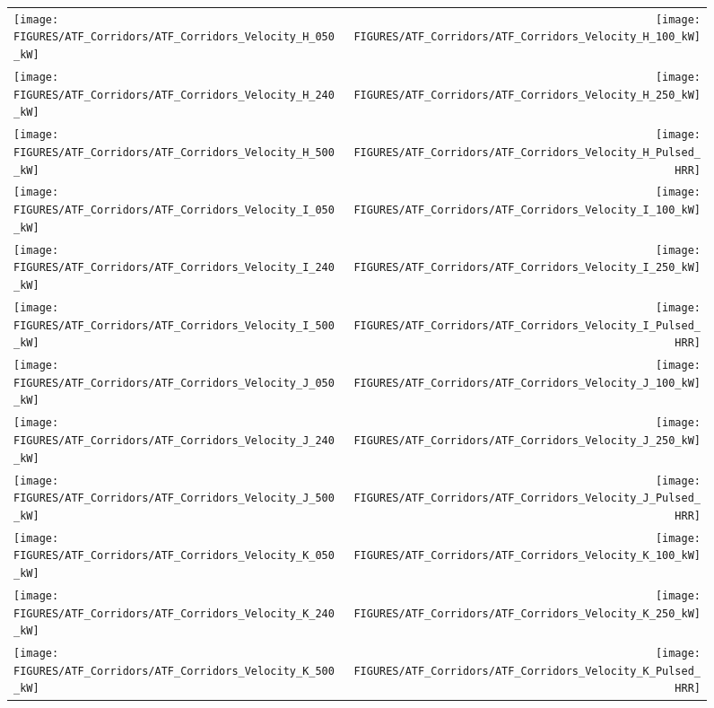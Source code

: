 \begin{figure}[h!]
\begin{tabular*}{\textwidth}{l@{\extracolsep{\fill}}r}
\texttt{[image: FIGURES/ATF\_Corridors/ATF\_Corridors\_Velocity\_H\_050\_kW]} &
\texttt{[image: FIGURES/ATF\_Corridors/ATF\_Corridors\_Velocity\_H\_100\_kW]} \\
\texttt{[image: FIGURES/ATF\_Corridors/ATF\_Corridors\_Velocity\_H\_240\_kW]} &
\texttt{[image: FIGURES/ATF\_Corridors/ATF\_Corridors\_Velocity\_H\_250\_kW]} \\
\texttt{[image: FIGURES/ATF\_Corridors/ATF\_Corridors\_Velocity\_H\_500\_kW]} &
\texttt{[image: FIGURES/ATF\_Corridors/ATF\_Corridors\_Velocity\_H\_Pulsed\_HRR]} \\
\texttt{[image: FIGURES/ATF\_Corridors/ATF\_Corridors\_Velocity\_I\_050\_kW]} &
\texttt{[image: FIGURES/ATF\_Corridors/ATF\_Corridors\_Velocity\_I\_100\_kW]} \\
\texttt{[image: FIGURES/ATF\_Corridors/ATF\_Corridors\_Velocity\_I\_240\_kW]} &
\texttt{[image: FIGURES/ATF\_Corridors/ATF\_Corridors\_Velocity\_I\_250\_kW]} \\
\texttt{[image: FIGURES/ATF\_Corridors/ATF\_Corridors\_Velocity\_I\_500\_kW]} &
\texttt{[image: FIGURES/ATF\_Corridors/ATF\_Corridors\_Velocity\_I\_Pulsed\_HRR]} \\
\texttt{[image: FIGURES/ATF\_Corridors/ATF\_Corridors\_Velocity\_J\_050\_kW]} &
\texttt{[image: FIGURES/ATF\_Corridors/ATF\_Corridors\_Velocity\_J\_100\_kW]} \\
\texttt{[image: FIGURES/ATF\_Corridors/ATF\_Corridors\_Velocity\_J\_240\_kW]} &
\texttt{[image: FIGURES/ATF\_Corridors/ATF\_Corridors\_Velocity\_J\_250\_kW]} \\
\texttt{[image: FIGURES/ATF\_Corridors/ATF\_Corridors\_Velocity\_J\_500\_kW]} &
\texttt{[image: FIGURES/ATF\_Corridors/ATF\_Corridors\_Velocity\_J\_Pulsed\_HRR]} \\
\texttt{[image: FIGURES/ATF\_Corridors/ATF\_Corridors\_Velocity\_K\_050\_kW]} &
\texttt{[image: FIGURES/ATF\_Corridors/ATF\_Corridors\_Velocity\_K\_100\_kW]} \\
\texttt{[image: FIGURES/ATF\_Corridors/ATF\_Corridors\_Velocity\_K\_240\_kW]} &
\texttt{[image: FIGURES/ATF\_Corridors/ATF\_Corridors\_Velocity\_K\_250\_kW]} \\
\texttt{[image: FIGURES/ATF\_Corridors/ATF\_Corridors\_Velocity\_K\_500\_kW]} &
\texttt{[image: FIGURES/ATF\_Corridors/ATF\_Corridors\_Velocity\_K\_Pulsed\_HRR]} \\
\end{tabular*}
\label{Restivo_Velocity}
\end{figure}

